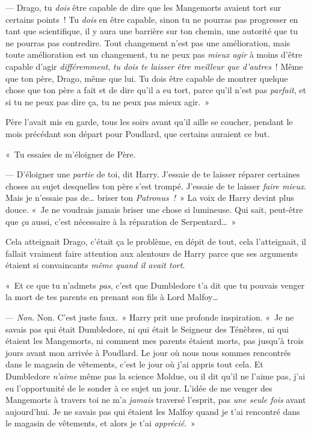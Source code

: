 --- Drago, tu \emph{dois} être capable de dire que les Mangemorts avaient tort sur certains points~! Tu \emph{dois} en être capable, sinon tu ne pourras pas progresser en tant que scientifique, il y aura une barrière sur ton chemin, une autorité que tu ne pourras pas contredire. Tout changement n'est pas une amélioration, mais toute amélioration est un changement, tu ne peux pas \emph{mieux agir} à moins d'être capable d'agir \emph{différemment}, \emph{tu dois te laisser être meilleur que d'autres}~! Même que ton père, Drago, même que lui. Tu dois être capable de montrer quelque chose que ton père a fait et de dire qu'il a eu tort, parce qu'il n'est pas \emph{parfait}, et si tu ne peux pas dire ça, tu ne peux pas mieux agir.~»

Père l'avait mis en garde, tous les soirs avant qu'il aille se coucher, pendant le mois précédant son départ pour Poudlard, que certains auraient ce but.

«~Tu essaies de m'éloigner de Père.

--- D'éloigner une \emph{partie} de toi, dit Harry. J'essaie de te laisser réparer certaines choses au sujet desquelles ton père s'est trompé. J'essaie de te laisser \emph{faire mieux}. Mais je n'essaie pas de… briser ton \emph{Patronus~!}~» La voix de Harry devint plus douce. «~Je ne voudrais jamais briser une chose si lumineuse. Qui sait, peut-être que \emph{ça} aussi, c'est nécessaire à la réparation de Serpentard…~»

Cela atteignait Drago, c'était ça le problème, en dépit de tout, cela l'atteignait, il fallait vraiment faire attention aux alentours de Harry parce que ses arguments étaient si convaincants \emph{même quand il avait tort}.

«~Et ce que tu n'admets \emph{pas}, c'est que Dumbledore t'a dit que tu pouvais venger la mort de tes parents en prenant son fils à Lord Malfoy…

--- \emph{Non}. Non. C'est juste faux.~» Harry prit une profonde inspiration. «~Je ne savais pas qui était Dumbledore, ni qui était le Seigneur des Ténèbres, ni qui étaient les Mangemorts, ni comment mes parents étaient morts, pas jusqu'à trois jours avant mon arrivée à Poudlard. Le jour où nous nous sommes rencontrés dans le magasin de vêtements, c'est le jour où j'ai appris tout cela. Et Dumbledore \emph{n'aime} même pas la science Moldue, ou il dit qu'il ne l'aime pas, j'ai eu l'opportunité de le sonder à ce sujet un jour. L'idée de me venger des Mangemorts à travers toi ne m'a \emph{jamais} traversé l'esprit, pas \emph{une seule fois} avant aujourd'hui. Je ne savais pas qui étaient les Malfoy quand je t'ai rencontré dans le magasin de vêtements, et alors je t'ai \emph{apprécié}.~»

